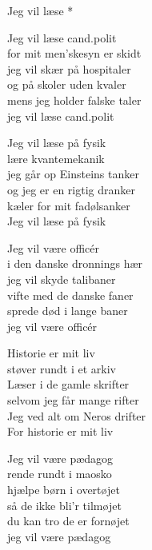 \begin{song}{Jeg vil læse *}
  \begin{SBVerse}
    Jeg vil læse cand.polit\\
    for mit men'skesyn er skidt\\
    jeg vil skær på hospitaler\\
    og på skoler uden kvaler\\
    mens jeg holder falske taler\\
    jeg vil læse cand.polit
  \end{SBVerse}

  \begin{SBVerse}
    Jeg vil læse på fysik\\
    lære kvantemekanik\\
    jeg går op Einsteins tanker\\
    og jeg er en rigtig dranker\\
    kæler for mit fadølsanker\\
    Jeg vil læse på fysik
  \end{SBVerse}

  \begin{SBVerse}
    Jeg vil være officér\\
    i den danske dronnings hær\\
    jeg vil skyde talibaner\\
    vifte med de danske faner\\
    sprede død i lange baner\\
    jeg vil være officér
  \end{SBVerse}

  \begin{SBVerse}
    Historie er mit liv\\
    støver rundt i et arkiv\\
    Læser i de gamle skrifter\\
    selvom jeg får mange rifter\\
    Jeg ved alt om Neros drifter\\
    For historie er mit liv
  \end{SBVerse}

  \begin{SBVerse}
    Jeg vil være pædagog\\
    rende rundt i maosko\\
    hjælpe børn i overtøjet\\
    så de ikke bli'r tilmøjet\\
    du kan tro de er fornøjet\\
    jeg vil være pædagog
  \end{SBVerse}


\end{song}
